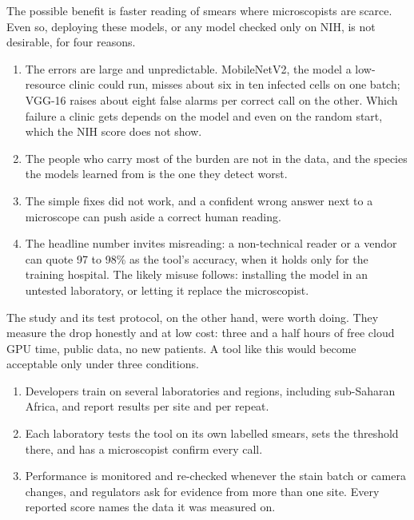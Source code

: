 \documentclass[11pt,a4paper]{article}
\begin{document}
The possible benefit is faster reading of smears where microscopists are scarce. Even so, deploying these models, or any model checked only on NIH, is not desirable, for four reasons.

\begin{enumerate}
\item The errors are large and unpredictable. \mbox{MobileNetV2}, the model a low-resource clinic could run, misses about six in ten infected cells on one batch; VGG-16 raises about eight false alarms per correct call on the other. Which failure a clinic gets depends on the model and even on the random start, which the NIH score does not show.
\item The people who carry most of the burden are not in the data, and the species the models learned from is the one they detect worst.
\item The simple fixes did not work, and a confident wrong answer next to a microscope can push aside a correct human reading.
\item The headline number invites misreading: a non-technical reader or a vendor can quote 97 to 98\% as the tool's accuracy, when it holds only for the training hospital. The likely misuse follows: installing the model in an untested laboratory, or letting it replace the microscopist.
\end{enumerate}

The study and its test protocol, on the other hand, were worth doing. They measure the drop honestly and at low cost: three and a half hours of free cloud GPU time, public data, no new patients. A tool like this would become acceptable only under three conditions.

\begin{enumerate}
\item Developers train on several laboratories and regions, including sub-Saharan Africa, and report results per site and per repeat.
\item Each laboratory tests the tool on its own labelled smears, sets the threshold there, and has a microscopist confirm every call.
\item Performance is monitored and re-checked whenever the stain batch or camera changes, and regulators ask for evidence from more than one site. Every reported score names the data it was measured on.
\end{enumerate}

\printbibliography[heading=ctbib,title=References]
\end{document}
